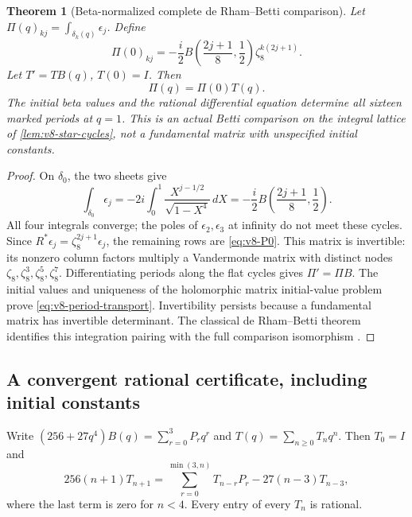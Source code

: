 \documentclass[11pt]{article}
\newtheorem{theorem}{Theorem}[section]
\theoremstyle{definition}
\theoremstyle{remark}
\begin{document}
\begin{theorem}[Beta-normalized complete de Rham--Betti comparison]
\label{thm:v8-period-matrix}
Let $\Pi(q)_{kj}=\int_{\delta_k(q)}\epsilon_j$. Define
\begin{equation}
 \boxed{\Pi(0)_{kj}=-\frac{i}{2}
 B\!\left(\frac{2j+1}{8},\frac12\right)
 \zeta_8^{k(2j+1)}.}
 \label{eq:v8-P0}
\end{equation}
Let $T'=TB(q)$, $T(0)=I$. Then
\begin{equation}
 \boxed{\Pi(q)=\Pi(0)T(q).}
 \label{eq:v8-period-transport}
\end{equation}
The initial beta values and the rational differential equation determine all
sixteen marked periods at $q=1$. This is an actual Betti comparison on the
integral lattice of \cref{lem:v8-star-cycles}, not a fundamental matrix with
unspecified initial constants.
\end{theorem}
\begin{proof}
On $\delta_0$, the two sheets give
\[
 \int_{\delta_0}\epsilon_j
 =-2i\int_0^1\frac{X^{j-1/2}}{\sqrt{1-X^4}}\,dX
 =-\frac i2 B\!\left(\frac{2j+1}{8},\frac12\right).
\]
All four integrals converge; the poles of $\epsilon_2,\epsilon_3$ at
infinity do not meet these cycles. Since
$R^*\epsilon_j=\zeta_8^{2j+1}\epsilon_j$, the remaining rows are
\eqref{eq:v8-P0}. This matrix is invertible: its nonzero column factors
multiply a Vandermonde matrix with distinct nodes
$\zeta_8,\zeta_8^3,\zeta_8^5,\zeta_8^7$.
Differentiating periods along the flat cycles gives $\Pi'=\Pi B$.
The initial values and uniqueness of the holomorphic matrix initial-value
problem prove \eqref{eq:v8-period-transport}. Invertibility persists because
a fundamental matrix has invertible determinant. The classical de
Rham--Betti theorem identifies this integration pairing with the full
comparison isomorphism \cite{KTdeRham,MilneAV}.
\end{proof}

\subsection{A convergent rational certificate, including initial constants}
Write $(256+27q^4)B(q)=\sum_{r=0}^3P_rq^r$ and
$T(q)=\sum_{n\ge0}T_nq^n$. Then $T_0=I$ and
\begin{equation}
 \boxed{256(n+1)T_{n+1}
 =\sum_{r=0}^{\min(3,n)}T_{n-r}P_r
 -27(n-3)T_{n-3},}
 \label{eq:v8-Trec}
\end{equation}
where the last term is zero for $n<4$. Every entry of every $T_n$ is
rational.
\end{document}
